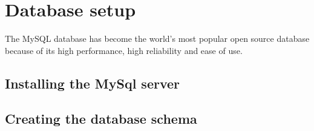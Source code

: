 \section{Database setup}
The MySQL database has become the world's most popular open source database because of its high performance, high reliability and ease of use.
\subsection{Installing the MySql server}
\subsection{Creating the database schema}
